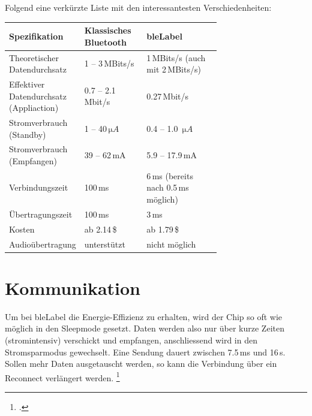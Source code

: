 Folgend eine verkürzte Liste mit den interessantesten Verschiedenheiten:
\begin{table}[H]
	\small\sffamily\renewcommand{\arraystretch}{1.4}
	\begin{tabular}{p{0.35\linewidth}lp{0.35\linewidth}}
		\toprule
		Spezifikation & Klassisches Bluetooth & \gls{bleLabel}\\
		\midrule
		Theoretischer Datendurchsatz & 1 -- 3\,MBits/s & 1\,MBits/s (auch mit 2\,MBits/s)\\
		Effektiver Datendurchsatz (Appliaction) & 0.7 -- 2.1\,Mbit/s	& 0.27\,Mbit/s\\
		
		Stromverbrauch (Standby) & 1 -- 40\,$\si{\micro A}$ &  0.4 -- 1.0 \,$\si{\micro A}$ \\
		Stromverbrauch (Empfangen) & 39 -- 62\,mA &  5.9 -- 17.9\,mA \\
		
		Verbindungszeit & 100\,ms & 6\,ms (bereits nach 0.5\,ms möglich)\\
		Übertragungszeit & 100\,ms & 3\,ms\\
		Kosten & ab 2.14\,\$ & ab 1.79\,\$ \\
		Audioübertragung & unterstützt & nicht möglich\\
		\bottomrule
	\end{tabular}
\end{table}


\section{Kommunikation}
Um bei \gls{bleLabel} die Energie-Effizienz zu erhalten, wird der Chip so oft wie möglich in den Sleepmode gesetzt. Daten werden also nur über kurze Zeiten (stromintensiv) verschickt und empfangen, anschliessend wird in den Stromsparmodus gewechselt.
Eine Sendung dauert zwischen 7.5\,ms und 16\,s.
Sollen mehr Daten ausgetauscht werden, so kann die Verbindung über ein Reconnect verlängert werden.
\footcite[][5]{ti_whitepaper_2015-05-08}

